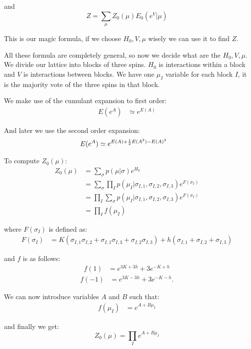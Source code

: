 \documentclass[11pt]{article}
\begin{document}
and
$$\boxed{Z = \sum_{\mu} Z_{0}(\mu)E_{0}(e^{V} | \mu)}$$

This is our magic formula, if we choose
$H_0, V, \mu$ wisely we can use it to find $Z$.

All these formula are completely general, so
now we decide what are the $H_0, V, \mu$.
We divide our lattice into blocks of three spins.
$H_0$ is interactions within a block and $V$ is
interactions between blocks.
We have one $\mu_I$ variable for each block $I$,
it is the majority vote of the three spins %
in that block.

We make use of the cumulant expansion to first order:
\begin{align*}
E(e^{A}) &\simeq e^{E(A)}
\end{align*}

And later we use the second order expansion:
\begin{align*}
E(e^{A}) &\simeq e^{E(A)+{{1} \over {2}}E(A^{2})-E(A)^{2}}
\end{align*}

To compute $Z_0(\mu)$:
\begin{align*}
Z_{0}(\mu) &= \sum_{\sigma} p(\mu | \sigma)e^{H_{0}}\\
 &= \sum_{\sigma} \prod_{I} p(\mu_{I} | \sigma_{I,1}, \sigma_{I,2}, \sigma_{I,3})e^{F(\sigma_{I})}\\
 &= \prod_{I} \sum_{\sigma} p(\mu_{I} | \sigma_{I,1}, \sigma_{I,2}, \sigma_{I,3})e^{F(\sigma_{I})}\\
 &= \prod_{I} f(\mu_{I})
\end{align*}

where $F(\sigma_I)$ is defined as:
\begin{align*}
F(\sigma_{I}) &= K(\sigma_{I,1}\sigma_{I,2}+\sigma_{I,1}\sigma_{I,3}+\sigma_{I,2}\sigma_{I,3})+h(\sigma_{I,1}+\sigma_{I,2}+\sigma_{I,3})
\end{align*}

and $f$ is as follows:
\begin{align*}
f(1) &= e^{3K+3h}+3e^{-K+h}
\end{align*}
\begin{align*}
f(-1) &= e^{3K-3h}+3e^{-K-h}.
\end{align*}

We can now introduce variables $A$ and $B$ such that:
\begin{align*}
f(\mu_{I}) &= e^{A+B\mu_{I}}
\end{align*}

and finally we get:
$$\boxed{Z_{0}(\mu) = \prod_{I} e^{A+B\mu_{I}}}$$
\end{document}
